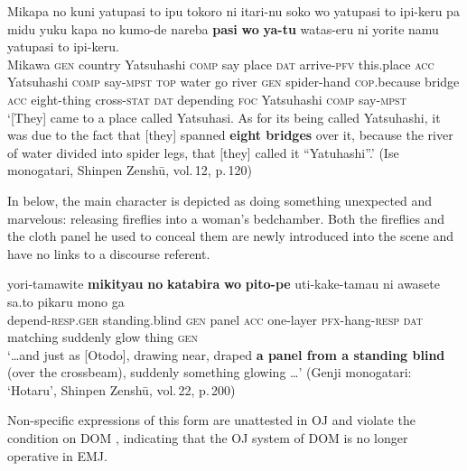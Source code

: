\documentclass[output=paper]{LSP/langsci}
\begin{document}
\begin{exe}
\ex%
\label{07-fr-ex:36}
\gll Mikapa no kuni yatupasi to ipu tokoro ni itari-nu soko wo yatupasi to ipi-keru pa midu yuku kapa no kumo-de nareba \textbf{pasi} \textbf{wo} \textbf{ya-tu} watas-eru ni yorite namu yatupasi to ipi-keru.\\
Mikawa \textsc{gen} country Yatsuhashi \textsc{comp} say place \textsc{dat} arrive-\textsc{pfv} this.place \textsc{acc} Yatsuhashi \textsc{comp} say-\textsc{mpst} \textsc{top} water go river \textsc{gen} spider-hand \textsc{cop}.because  bridge \textsc{acc} eight-thing cross-\textsc{stat} \textsc{dat} depending \textsc{foc} Yatsuhashi \textsc{comp} say-\textsc{mpst}\\ 
\glt ‘[They] came to a place called Yatsuhasi. As for its being called Yatsuhashi, it was due to the fact that [they] spanned \textbf{eight bridges} over it, because the river of water divided into spider legs, that [they] called it “Yatuhashi”.’  (Ise monogatari, Shinpen Zenshū, vol.\,12, p.\,120)\\
\end{exe} 

In  below, the main character is depicted as doing something unexpected and marvelous: releasing fireflies into a woman’s bedchamber. Both the fireflies and the cloth panel he used to conceal them are newly introduced into the scene and have no links to a  discourse referent. 


\begin{exe}
\ex%
\label{07-fr-ex:37}
\gll yori-tamawite \textbf{mikityau} \textbf{no} \textbf{katabira} \textbf{wo} \textbf{pito-pe} uti-kake-tamau ni awasete sa.to pikaru mono ga\\
depend-\textsc{resp}.\textsc{ger} standing.blind \textsc{gen} panel \textsc{acc} one-layer \textsc{pfx}-hang-\textsc{resp} \textsc{dat} matching suddenly glow thing \textsc{gen}\\
\glt ‘…and just as [Otodo], drawing near, draped \textbf{a panel from a standing blind} (over the crossbeam), suddenly something glowing …’  (Genji monogatari: ‘Hotaru’, Shinpen Zenshū, vol.\,22, p.\,200) 
\end{exe}

Non-specific expressions of this form are unattested in OJ   and violate the condition on DOM , indicating that the OJ   system of DOM is no longer operative in EMJ. 
\end{document}
